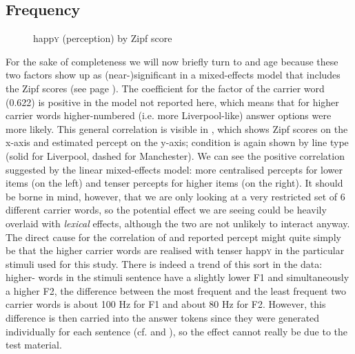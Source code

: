 \subsection{Frequency}
\label{sec.perc_res.happy.frequency}

\begin{figure}
	
		\resizebox{.49\linewidth}{!}{} 
	\caption{happ\textsc{y} (perception) by Zipf score}
	\label{fig.scatter.happy.ext.zipf}
\end{figure}

For the sake of completeness we will now briefly turn to  and age because these two factors show up as (near-)significant in a mixed-effects model that includes the Zipf scores (see page \pageref{sec.perc_res.happy}).
The coefficient for the factor  of the carrier word (0.622) is positive in the model not reported here, which means that for higher  carrier words higher-numbered (i.e. more Liverpool-like) answer options were more likely.
This general correlation is visible in , which shows Zipf scores on the x-axis and estimated percept on the y-axis;  condition is again shown by line type (solid for Liverpool, dashed for Manchester).
We can see the positive correlation suggested by the linear mixed-effects model: more centralised percepts for lower  items (on the left) and tenser percepts for higher  items (on the right).
It should be borne in mind, however, that we are only looking at a very restricted set of 6 different carrier words, so the potential  effect we are seeing could be heavily overlaid with \emph{lexical} effects, although the two are not unlikely to interact anyway.
The direct cause for the correlation of  and reported percept might quite simply be that the higher  carrier words are realised with tenser happ\textsc{y} in the particular stimuli used for this study.
There is indeed a trend of this sort in the data: higher- words in the stimuli sentence have a slightly lower F1 and simultaneously a higher F2, the difference between the most frequent and the least frequent two carrier words is about 100 Hz for F1 and about 80 Hz for F2.
However, this difference is then carried into the answer tokens since they were generated individually for each sentence (cf.  and ), so the effect cannot really be due to the test material.
